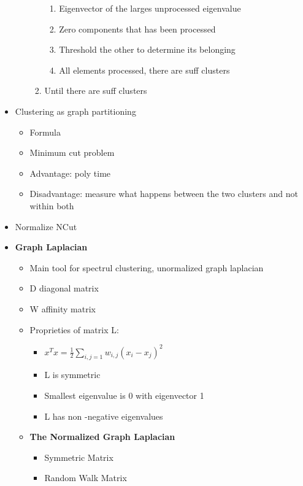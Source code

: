 \begin{itemize}
\begin{itemize}
\begin{enumerate}
\begin{enumerate}
                \item Eigenvector of the larges unprocessed eigenvalue
                \item Zero components that has been processed
                \item Threshold the other to determine its belonging
                \item All elements processed, there are suff clusters
            \end{enumerate}
            \item Until there are suff clusters
        \end{enumerate}
    \end{itemize}
    \item Clustering as graph partitioning
    \begin{itemize}
        \item Formula
        \item Minimum cut problem
        \item Advantage: poly time
        \item Disadvantage: measure what happens between the two clusters and not within both
    \end{itemize}
    \item Normalize NCut
    \item \textbf{Graph Laplacian}
    \begin{itemize}
        \item Main tool for spectrul clustering, unormalized graph laplacian
        \item D diagonal matrix
        \item W affinity matrix
        \item Proprieties of matrix L:
        \begin{itemize}
            \item \(x^Tx = \frac{1}{2}\sum_{i,j = 1}w_{i,j}(x_i - x_j)^2\)
            \item L is symmetric
            \item Smallest eigenvalue is 0 with eigenvector 1
            \item L has non -negative eigenvalues
        \end{itemize}
        \item \textbf{The Normalized Graph Laplacian}
        \begin{itemize}
            \item Symmetric Matrix
            \item Random Walk Matrix

\end{itemize}
\end{itemize}
\end{itemize}
